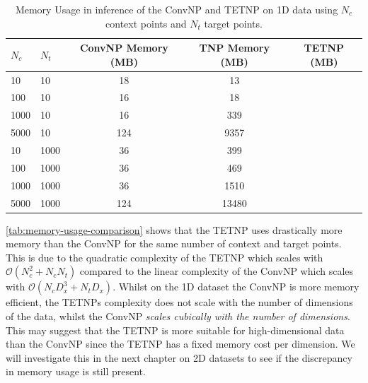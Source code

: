 \documentclass[../../main.tex]{subfiles}
\begin{document}
\begin{table}[H]
	\centering
	\begin{tabular}{@{}llccc@{}}
	\toprule
	$N_c$ & $N_t$ & ConvNP Memory (MB) & TNP Memory (MB)  & TETNP (MB)\\ \midrule
	10    & 10    & 18                 & 13               &  \\
	100   & 10    & 16                 & 18               &  \\
	1000  & 10    & 16                 & 339              &  \\
	5000  & 10    & 124                & 9357             &  \\ \midrule
	10    & 1000  & 36                 & 399              &  \\
	100   & 1000  & 36                 & 469              &  \\
	1000  & 1000  & 36                 & 1510             &  \\
	5000  & 1000  & 124                & 13480            &  \\ \bottomrule
	\end{tabular}
	\caption{Memory Usage in inference of the ConvNP and TETNP on 1D data using $N_c$ context points and $N_t$ target points.}
	\label{tab:memory-usage-comparison}
\end{table}

\autoref{tab:memory-usage-comparison} shows that the TETNP uses drastically more memory than the ConvNP for the same number of context and target points. This is due to the quadratic complexity of the TETNP which scales with $\mathcal{O}(N_c^2 + N_cN_t)$ compared to the linear complexity of the ConvNP which scales with $\mathcal{O}(N_cD_x^3 + N_tD_x)$. Whilst on the 1D dataset the ConvNP is more memory efficient, the TETNPs complexity does not scale with the number of dimensions of the data, whilst the ConvNP \emph{scales cubically with the number of dimensions}. This may suggest that the TETNP is more suitable for high-dimensional data than the ConvNP since the TETNP has a fixed memory cost per dimension. We will investigate this in the next chapter on 2D datasets to see if the discrepancy in memory usage is still present.

\ifSubfilesClassLoaded{%
    \printbibliography{}
}{} 
\end{document}
